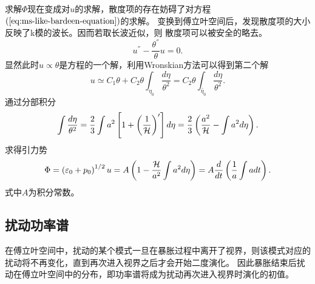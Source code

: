 求解$\Phi$现在变成对$u$的求解，散度项的存在妨碍了对方程$(\ref{eq:ms-like-bardeen-equation})$的求解。
变换到傅立叶空间后，发现散度项的大小反映了k模的波长。因而若取长波近似，则
散度项可以被安全的略去。
\begin{equation}
  u^{\dprime} - \frac{\theta^{\dprime}}{\theta} u =0. 
\end{equation}
显然此时$u\propto \theta$是方程的一个解，利用Wronskian方法可以得到第二个解
\begin{equation}
  u\simeq C_1\theta +C_2\theta \int_{\eta_0}\frac{d\eta}{\theta^2}
  =C_2\theta \int_{\tilde{\eta_0}}\frac{d\eta}{\theta^2}.
\end{equation}
通过分部积分
\begin{equation}
  \int \frac{d\eta}{\theta^2}=
  \frac{2}{3}\int a^2\left[1+\left(\frac{1}{\mathcal{H}}\right)^{\prime}\right]d\eta
  =\frac{2}{3}\left(\frac{a^2}{\mathcal{H}}-\int a^2d\eta\right).
\end{equation}
求得引力势
\begin{equation}
  \Phi=\left(\varepsilon_0+p_0\right)^{1 /2}u
  = A\left(1-\frac{\mathcal{H}}{a^2}\int a^2d\eta\right)
  = A \frac{d}{dt}\left(\frac{1}{a}\int adt\right).
\end{equation}
式中$A$为积分常数。

\subsection{扰动功率谱}
在傅立叶空间中，扰动的某个模式一旦在暴胀过程中离开了视界，则该模式对应的扰动将不再变化，直到再次进入视界之后才会开始二度演化。
因此暴胀结束后扰动在傅立叶空间中的分布，即功率谱将成为扰动再次进入视界时演化的初值。


